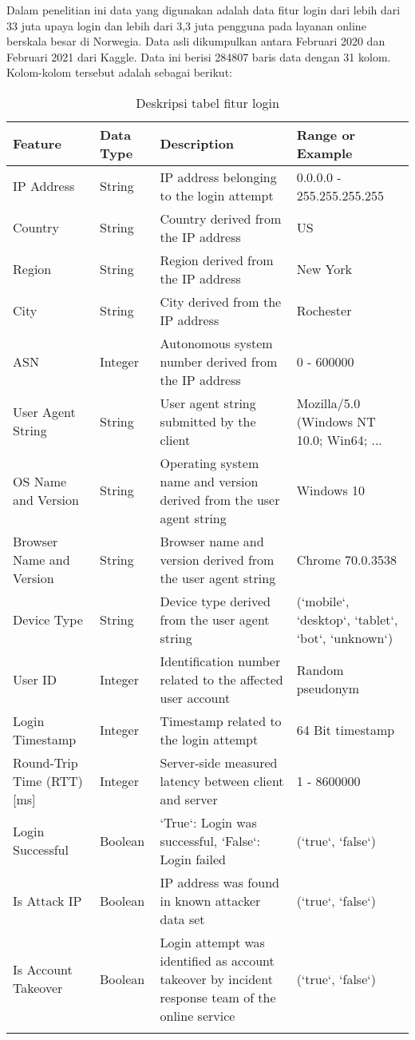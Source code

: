 Dalam penelitian ini data yang digunakan adalah data fitur login dari lebih dari 33 juta upaya login dan lebih dari 3,3 juta pengguna pada layanan online berskala besar di Norwegia. Data asli dikumpulkan antara Februari 2020 dan Februari 2021 dari Kaggle. Data ini berisi 284807 baris data dengan 31 kolom. Kolom-kolom tersebut adalah sebagai berikut:

\begin{longtable}{|p{}|p{}|p{}|p{}|}
    \hline
    \textbf{Feature} & \textbf{Data Type} & \textbf{Description} & \textbf{Range or Example} \\ \hline
    IP Address & String & IP address belonging to the login attempt & 0.0.0.0 - 255.255.255.255 \\ \hline
    Country & String & Country derived from the IP address & US \\ \hline
    Region & String & Region derived from the IP address & New York \\ \hline
    City & String & City derived from the IP address & Rochester \\ \hline
    ASN & Integer & Autonomous system number derived from the IP address & 0 - 600000 \\ \hline
    User Agent String & String & User agent string submitted by the client & Mozilla/5.0 (Windows NT 10.0; Win64; ... \\ \hline
    OS Name and Version & String & Operating system name and version derived from the user agent string & Windows 10 \\ \hline
    Browser Name and Version & String & Browser name and version derived from the user agent string & Chrome 70.0.3538 \\ \hline
    Device Type & String & Device type derived from the user agent string & (`mobile`, `desktop`, `tablet`, `bot`, `unknown`) \\ \hline
    User ID & Integer & Identification number related to the affected user account & Random pseudonym \\ \hline
    Login Timestamp & Integer & Timestamp related to the login attempt & 64 Bit timestamp \\ \hline
    Round-Trip Time (RTT) [ms] & Integer & Server-side measured latency between client and server & 1 - 8600000 \\ \hline
    Login Successful & Boolean & `True`: Login was successful, `False`: Login failed & (`true`, `false`) \\ \hline
    Is Attack IP & Boolean & IP address was found in known attacker data set & (`true`, `false`) \\ \hline
    Is Account Takeover & Boolean & Login attempt was identified as account takeover by incident response team of the online service & (`true`, `false`) \\ \hline
    \caption{Deskripsi tabel fitur login}
    \label{tab:my_label}
\end{longtable}